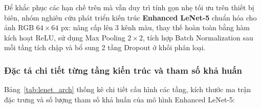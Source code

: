 \documentclass[a4paper, 11pt]{article}
\begin{document}
Để khắc phục các hạn chế trên mà vẫn duy trì tính gọn nhẹ tối ưu trên thiết bị biên, nhóm nghiên cứu phát triển kiến trúc \textbf{Enhanced LeNet-5} chuẩn hóa cho ảnh RGB $64 \times 64\text{ px}$: nâng cấp lên 3 kênh màu, thay thế hoàn toàn bằng hàm kích hoạt ReLU, sử dụng Max Pooling $2 \times 2$, tích hợp Batch Normalization sau mỗi tầng tích chập và bổ sung 2 tầng Dropout ở khối phân loại.

\subsubsection{Đặc tả chi tiết từng tầng kiến trúc và tham số khả huấn}
\label{subsubsec:lenet_kien_truc}

Bảng~\ref{tab:lenet_arch} thống kê chi tiết cấu hình các tầng, kích thước ma trận đặc trưng và số lượng tham số khả huấn của mô hình Enhanced LeNet-5:
\end{document}
